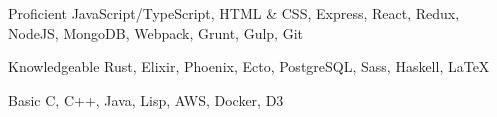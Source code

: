 

\begin{cvskills}

  \cvskill
    {Proficient} %
    {JavaScript/TypeScript, HTML \& CSS, Express, React, Redux, NodeJS, MongoDB, Webpack, Grunt, Gulp, Git} %

  \cvskill
    {Knowledgeable} %
    {Rust, Elixir, Phoenix, Ecto, PostgreSQL, Sass, Haskell, \LaTeX} %

  \cvskill
    {Basic} %
    {C, C++, Java, Lisp, AWS, Docker, D3} %

\end{cvskills}

